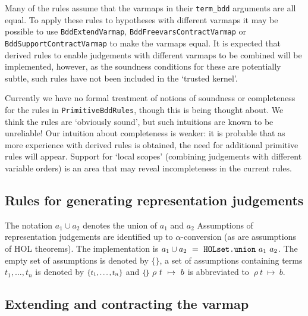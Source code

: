 \documentclass[12pt,fleqn]{article}
\renewcommand{\t}[1]{\mbox{\tt #1}}
\newcommand{\termbdd}[4]{\mbox{$#1~#2~#3~\mapsto~#4$}}
\newcommand{\emptyass}{\mbox{\footnotesize$\{{}\}$}{}}
\newcommand{\setass}[1]{\mbox{\footnotesize$\{#1\}$}{}}
\newcommand\termbddty{\texttt{term\_bdd}{}}
\begin{document}
Many of the rules assume that the varmaps in their \termbddty
arguments are all equal. To apply these rules to hypotheses with
different varmaps it may be possible to use \t{BddExtendVarmap},
\t{BddFreevarsContractVarmap} or \t{BddSupportContractVarmap} to make
the varmaps equal.  It is expected that derived rules to enable
judgements with different varmaps to be combined will be implemented,
however, as the soundness conditions for these are potentially subtle,
such rules have not been included in the `trusted kernel'.

Currently we have no formal treatment of notions of soundness or
completeness for the rules in \t{PrimitiveBddRules}, though this is
being thought about. We think the rules are `obviously sound', but
such intuitions are known to be unreliable! Our intuition about
completeness is weaker: it is probable that as more experience with
derived rules is obtained, the need for additional primitive rules
will appear. Support for `local scopes' (combining judgements with
different variable orders) is an area that may reveal incompleteness
in the current rules.

\subsection{Rules for generating representation judgements}\label{term-bdd-rules}

The notation $a_1 \cup a_2$ denotes the union of $a_1$ and $a_2$
Assumptions of
representation judgements are identified up to $\alpha$-conversion (as
are assumptions of HOL theorems).
The implementation is $a_1 \cup a_2~=~\t{HOLset.union}~a_1~a_2$.
The empty set of assumptions is denoted by \emptyass, a set of
assumptions containing terms $t_1, \ldots ,t_n$ is denoted by
$\setass{t_1, \ldots ,t_n}$  and
$\termbdd{\emptyass}{\rho}{t}{b}$ is abbreviated to
$\termbdd{}{\rho}{t}{b}$.


\subsection{Extending and contracting the varmap}
\end{document}
